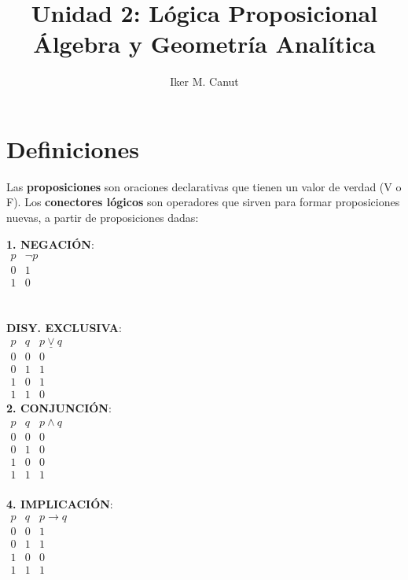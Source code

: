\documentclass[11pt,a4paper]{article}
\author{Iker M. Canut}
\title{Unidad 2: L\'ogica Proposicional\\\'Algebra y Geometr\'ia Anal\'itica}
\begin{document}
\maketitle
\newpage

\section{Definiciones}
\noindent Las \textbf{proposiciones} son oraciones declarativas que tienen un valor de verdad (V o F). Los \textbf{conectores l\'ogicos} son operadores que sirven para formar proposiciones nuevas, a partir de proposiciones dadas:
\begin{multicols}{3}
\noindent \textbf{1. NEGACI\'ON}:\\

\indent $\begin{array}{|c|c|}
p & \lnot p\\
\hline
0 & 1 \\
1 & 0
\end{array}$\\ \\ \\

\noindent \textbf{DISY. EXCLUSIVA}: \\
\indent $\begin{array}{|cc|c|}
p & q & p \underline{\lor} q\\
\hline
0 & 0 & 0\\
0 & 1 & 1\\
1 & 0 & 1\\
1 & 1 & 0
\end{array}$\\

\noindent \textbf{2. CONJUNCI\'ON}:\\
\indent $\begin{array}{|cc|c|}
p & q & p \land q\\
\hline
0 & 0 & 0\\
0 & 1 & 0\\
1 & 0 & 0\\
1 & 1 & 1
\end{array}$\\ \\

\noindent \textbf{4. IMPLICACI\'ON}: \\
\indent $\begin{array}{|cc|c|}
p & q & p \rightarrow q\\
\hline
0 & 0 & 1\\
0 & 1 & 1\\
1 & 0 & 0\\
1 & 1 & 1
\end{array}$\\


\end{multicols}
\end{document}
